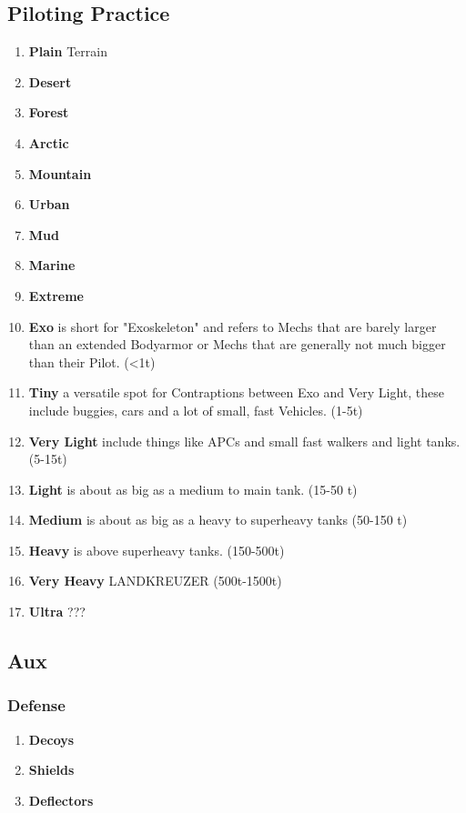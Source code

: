 \subsection{Piloting Practice}\label{subsec:piloting-practice}
\begin{enumerate}[label= -]
    \item \textbf{Plain} Terrain
    \item \textbf{Desert}
    \item \textbf{Forest}
    \item \textbf{Arctic}
    \item \textbf{Mountain}
    \item \textbf{Urban}
    \item \textbf{Mud}
    \item \textbf{Marine}
    \item \textbf{Extreme}

    \item \textbf{Exo} is short for "Exoskeleton" and refers to Mechs that are barely larger than an extended Bodyarmor
    or Mechs that are generally not much bigger than their Pilot. (<1t)
    \item \textbf{Tiny} a versatile spot for Contraptions between Exo and Very Light, these include buggies, cars and
    a lot of small, fast Vehicles. (1-5t)
    \item \textbf{Very Light} include things like APCs and small fast walkers and light tanks.(5-15t)
    \item \textbf{Light} is about as big as a medium to main tank. (15-50 t)
    \item \textbf{Medium} is about as big as a heavy to superheavy tanks (50-150 t)
    \item \textbf{Heavy} is above superheavy tanks. (150-500t)
    \item \textbf{Very Heavy} LANDKREUZER (500t-1500t)
    \item \textbf{Ultra} ???
\end{enumerate}
\subsection{Aux}\label{subsec:aux}
\subsubsection{Defense}
\begin{enumerate}[label= -]
    \item \textbf{Decoys}
    \item \textbf{Shields}
    \item \textbf{Deflectors}
\end{enumerate}
